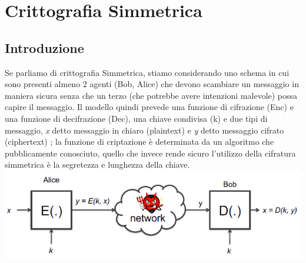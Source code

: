 \documentclass{article}
\begin{document}
  \tableofcontents

    
  \section{Crittografia Simmetrica}
  \subsection{Introduzione}
    Se parliamo di crittografia Simmetrica, stiamo considerando uno schema in cui sono presenti almeno 2 agenti (Bob, Alice) che devono scambiare un messaggio in maniera sicura senza che un terzo (che potrebbe avere intenzioni malevole) possa capire il messaggio. 
    Il modello quindi prevede una funzione di cifrazione (Enc) e una funzione di decifrazione (Dec), una chiave condivisa (k) e due tipi di messaggio, \textit{x} detto messaggio in chiaro (plaintext) e \textit{y} detto messaggio cifrato (ciphertext) ; la funzione di criptazione è determinata da un algoritmo che pubblicamente conosciuto, quello che invece rende sicuro l'utilizzo della cifratura simmetrica è la segretezza e lunghezza della chiave. 
    \includegraphics{./immagini/modello.png} 
    
\end{document}
